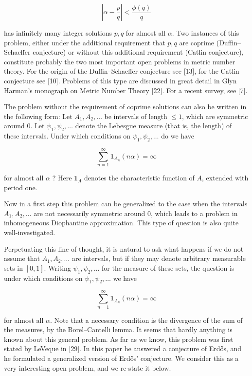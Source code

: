 \documentclass[10pt]{article}
\newcommand{\1}{\mathbf{1}}
\begin{document}
$$
\left|\alpha-\frac{p}{q}\right|<\frac{\phi(q)}{q}
$$

has infinitely many integer solutions $p, q$ for almost all $\alpha$. Two instances of this problem, either under the additional requirement that $p, q$ are coprime (Duffin--Schaeffer conjecture) or without this additional requirement (Catlin conjecture), constitute probably the two most important open problems in metric number theory. For the origin of the Duffin--Schaeffer conjecture see [13], for the Catlin conjecture see [10]. Problems of this type are discussed in great detail in Glyn Harman's monograph on Metric Number Theory [22]. For a recent survey, see [7].

The problem without the requirement of coprime solutions can also be written in the following form: Let $A_{1}, A_{2}, \ldots$ be intervals of length $\leqslant 1$, which are symmetric around $0$. Let $\psi_1,\psi_2,\ldots$ denote the Lebesgue measure (that is, the length) of these intervals. Under which conditions on $\psi_1,\psi_2,\ldots$ do we have

$$
\sum_{n=1}^{\infty} \mathbf{1}_{A_{n}}(n \alpha)=\infty
$$

for almost all $\alpha$ ? Here $\mathbf{1}_{A}$ denotes the characteristic function of $A$, extended with period one.

Now in a first step this problem can be generalized to the case when the intervals $A_{1}, A_{2}, \ldots$ are not necessarily symmetric around $0$, which leads to a problem in inhomogeneous Diophantine approximation. This type of question is also quite well-investigated.

Perpetuating this line of thought, it is natural to ask what happens if we do not assume that $A_{1}, A_{2}, \ldots$ are intervals, but if they may denote arbitrary measurable sets in $[0,1]$. Writing $\psi_1,\psi_2,\ldots$ for the measure of these sets, the question is under which conditions on $\psi_1,\psi_2,\ldots$ we have

$$
\sum_{n=1}^{\infty} \mathbf{1}_{A_{n}}(n \alpha)=\infty
$$

for almost all $\alpha$. Note that a necessary condition is the divergence of the sum of the measures, by the Borel--Cantelli lemma. It seems that hardly anything is known about this general problem. As far as we know, this problem was first stated by LeVeque in [29]. In this paper he answered a conjecture of Erdős, and he formulated a generalized version of Erdős' conjecture. We consider this as a very interesting open problem, and we re-state it below.
\end{document}
